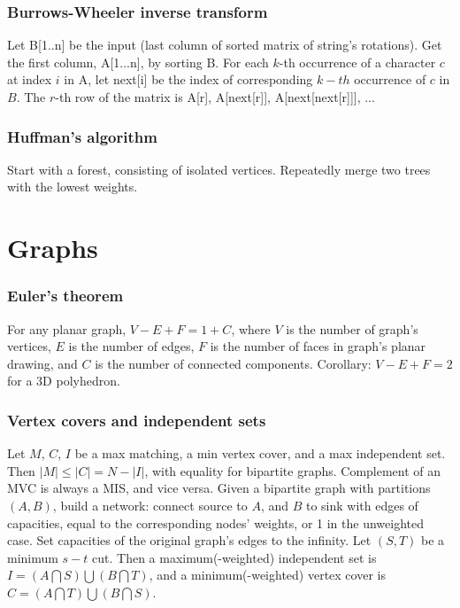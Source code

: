 \documentclass[a4paper,12pt]{article}
\begin{document}
\subsubsection{Burrows-Wheeler inverse transform}
Let B[1..n] be the input (last column of sorted matrix of string's rotations). Get the first column, A[1...n], by sorting B. For each $k$-th occurrence of a character $c$ at index $i$ in A, let next[i] be the index of corresponding $k-th$ occurrence of $c$ in $B$. The $r$-th row of the matrix is A[r], A[next[r]], A[next[next[r]]], ... 

\subsubsection{Huffman's algorithm}
Start with a forest, consisting of isolated vertices. Repeatedly merge two trees with the lowest weights.


\newpage

\section{Graphs}
\subsubsection{Euler’s theorem}
For any planar graph, $V - E + F = 1 + C$, where $V$ is the number of graph’s vertices, $E$ is the number of edges, $F$ is the number of faces in graph’s planar drawing,
and $C$ is the number of connected components. Corollary: $V - E + F = 2$ for a 3D polyhedron.

\subsubsection{Vertex covers and independent sets}
Let $M$, $C$, $I$ be a max matching, a min vertex cover, and a max independent set. Then $|M| \leq |C| = N - |I|$, with equality for bipartite graphs. Complement of an MVC is always a MIS, and vice versa.
Given a bipartite graph with partitions $(A,B)$, build a network: connect source to $A$, and $B$ to sink with edges of capacities, equal to the corresponding nodes’ weights, or 1 in the unweighted case.
Set capacities of the original graph’s edges to the infinity. Let $(S,T)$ be a minimum $s-t$ cut. 
Then a maximum(-weighted) independent set is $I = (A \bigcap S) \bigcup (B \bigcap T)$, and a minimum(-weighted) vertex cover is $C = (A \bigcap T) \bigcup (B \bigcap S)$.
\end{document}
